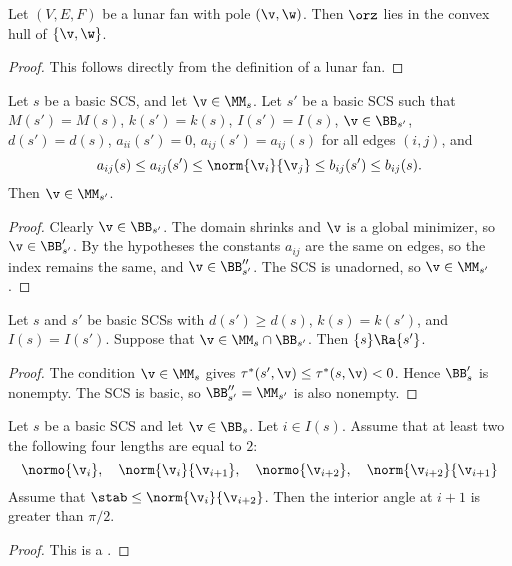 \begin{lemma}[]
Let $(V,E,F)$ be a lunar fan with pole $(\v,\w)$.  Then $\orz$ lies in the convex hull of $\{\v,\w\}$.
\end{lemma}

\begin{proof} This follows directly from the definition of a lunar fan.
\end{proof}

\begin{lemma}[]\label{lemma:transfer-prelim} 
Let $s$ be a basic SCS, and let $\v\in \MM_s$.  Let $s'$ be a basic SCS such that
$M(s')=M(s)$, $k(s')=k(s)$, $I(s')=I(s)$,  $\v\in \BB_{s'}$, $d(s')=d(s)$, $a_{ii}(s')=0$,
$a_{ij}(s') = a_{ij}(s)$ for all edges $(i,j)$, and
\[
a_{ij} (s) \le a_{ij}(s') \le \norm{\v_i}{\v_j} \le b_{ij}(s') \le b_{ij}(s).
\]
Then  $\v\in \MM_{s'}$.
\end{lemma}

\begin{proof} 
Clearly $\v\in \BB_{s'}$.  
The domain shrinks and $\v$ is a global minimizer, so $\v\in \BB'_{s'}$.
By the hypotheses the constants $a_{ij}$ are the same on edges, so the index remains the same, and $\v\in \BB''_{s'}$.
The SCS is unadorned, so $\v\in \MM_{s'}$.
\end{proof}

\begin{lemma}[]
Let $s$ and $s'$ be basic SCSs with $d(s') \ge d(s)$,  $k(s) = k(s')$, and $I(s) = I(s')$.
Suppose that $\v\in \MM_s \cap \BB_{s'}$.
Then $\{s\}\Ra \{s'\}$.
\end{lemma}

\begin{proof}
The condition $\v\in\MM_s$ gives $\tau^*(s',\v)\le \tau^*(s,\v)<0$.  Hence $\BB'_s$ is nonempty.
The SCS is basic, so $\BB''_{s'} = \MM_{s'}$ is also nonempty.
\end{proof}

\begin{lemma}\label{lemma:scs-obtuse}
Let $s$ be a basic SCS and let $\v\in \BB_s$. Let $i\in I(s)$.
Assume that at least two the following four lengths are equal to $2$:
\[
\normo{\v_i},\quad \norm{\v_i}{\v_{i+1}},\quad
\normo{\v_{i+2}},\quad \norm{\v_{i+2}}{\v_{i+1}}
\]
Assume that $\stab\le \norm{\v_i}{\v_{i+2}}$.  Then the interior angle at $i+1$ is
greater than $\pi/2$.
\end{lemma}

\begin{proof} This is a .
\end{proof}

